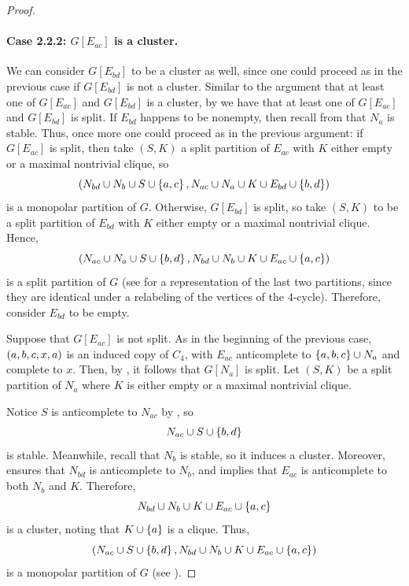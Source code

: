 \begin{proof}
    \paragraph{Case 2.2.2: $G[E_{ac}]$ is a cluster.} We can consider
    $G[E_{bd}]$ to be a cluster as well, since one could proceed as in the
    previous case if $G[E_{bd}]$ is not a cluster. Similar to the argument that
    at least one of $G[E_{ac}]$ and $G[E_{bd}]$ is a cluster, by
     we have that at least one of $G[E_{ac}]$ and $G[E_{bd}]$
    is split. If $E_{bd}$ happens to be nonempty, then recall from
     that $N_a$ is stable. Thus, once more one could proceed
    as in the previous argument: if $G[E_{ac}]$ is split, then take $(S,K)$ a
    split partition of $E_{ac}$ with $K$ either empty or a maximal nontrivial
    clique, so
    \[
        \left(N_{bd} \cup N_b \cup S  \cup \left\{a,c\right\}, N_{ac} \cup N_a \cup K \cup E_{bd}
        \cup \left\{b,d\right\}\right)
    \]
    is a monopolar partition of $G$. Otherwise, $G[E_{bd}]$ is split, so take
    $(S,K)$ to be a split partition of $E_{bd}$ with $K$ either empty or a
    maximal nontrivial clique. Hence,
    \[
        \left(N_{ac} \cup N_a \cup S  \cup \left\{b,d\right\}, N_{bd} \cup N_b \cup K \cup E_{ac}
        \cup \left\{a,c\right\}\right)
    \]
    is a split partition of $G$ (see
     for a representation of the
    last two partitions, since they are identical under a relabeling of the
    vertices of the $4$-cycle). Therefore, consider $E_{bd}$ to be empty.

    Suppose that $G[E_{ac}]$ is not split. As in the beginning of the previous
    case, $\left(a,b,c,x,a\right)$ is an induced copy of $C_4$, with $E_{ac}$
    anticomplete to $\left\{a,b,c\right\}\cup N_{a}$ and complete to $x$. Then, by
    , it follows that $G[N_a]$ is split. Let $(S,K)$ be a
    split partition of $N_a$ where $K$ is either empty or a maximal nontrivial
    clique.

    Notice $S$ is anticomplete to $N_{ac}$ by , so
    \[
        N_{ac} \cup S \cup \left\{b,d\right\}
    \]
    is stable. Meanwhile, recall that $N_b$ is stable, so it induces a cluster.
    Moreover,  ensures that $N_{bd}$ is anticomplete to $N_b$,
    and  implies that $E_{ac}$ is anticomplete to both $N_b$
    and $K$. Therefore,
    \[
        N_{bd} \cup N_b \cup K \cup E_{ac} \cup \left\{a,c\right\}
    \]
    is a cluster, noting that $K\cup \left\{a\right\}$ is a clique. Thus,
    \[
        \left(N_{ac} \cup S \cup \left\{b,d\right\} , N_{bd} \cup N_b \cup K 
        \cup E_{ac} \cup \left\{a,c\right\}\right)
    \]
    is a monopolar partition of $G$ (see
    ).


\end{proof}
